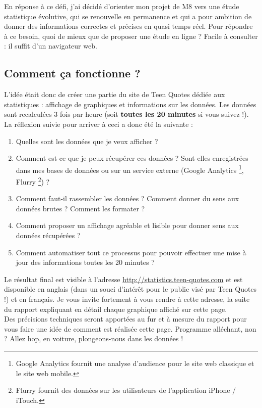 \documentclass{report}
\begin{document}
	En réponse à ce défi, j'ai décidé d'orienter mon projet de M8 vers une étude statistique évolutive, qui se renouvelle en permanence et qui a pour ambition de donner des informations correctes et précises en quasi temps réel. Pour répondre à ce besoin, quoi de mieux que de proposer une étude en ligne ? Facile à consulter : il suffit d'un navigateur web.

	\subsection{Comment ça fonctionne ?}
	L'idée était donc de créer une partie du site de Teen Quotes dédiée aux statistiques : affichage de graphiques et informations sur les données. Les données sont recalculées 3 fois par heure (soit \textbf{toutes les 20 minutes} si vous suivez !). La réflexion suivie pour arriver à ceci a donc été la suivante :
	\vspace{10px}
	\begin{enumerate}
		\item Quelles sont les données que je veux afficher ?
		\item Comment est-ce que je peux récupérer ces données ? Sont-elles enregistrées dans mes bases de données ou sur un service externe (Google Analytics \footnote{Google Analytics fournit une analyse d'audience pour le site web classique et le site web mobile.}, Flurry \footnote{Flurry fournit des données sur les utilisateurs de l'application iPhone / iTouch.}) ?
		\item Comment faut-il rassembler les données ? Comment donner du sens aux données brutes ? Comment les formater ?
		\item Comment proposer un affichage agréable et lisible pour donner sens aux données récupérées ?
		\item Comment automatiser tout ce processus pour pouvoir effectuer une mise à jour des informations toutes les 20 minutes ?
	\end{enumerate}
	\vspace{10px}
	Le résultat final est visible à l'adresse \url{http://statistics.teen-quotes.com} et est disponible en anglais (dans un souci d'intérêt pour le public visé par Teen Quotes !) et en français. Je vous invite fortement à vous rendre à cette adresse, la suite du rapport expliquant en détail chaque graphique affiché sur cette page.\\

	Des précisions techniques seront apportées au fur et à mesure du rapport pour vous faire une idée de comment est réalisée cette page. Programme alléchant, non ? Allez hop, en voiture, plongeons-nous dans les données !
\end{document}
